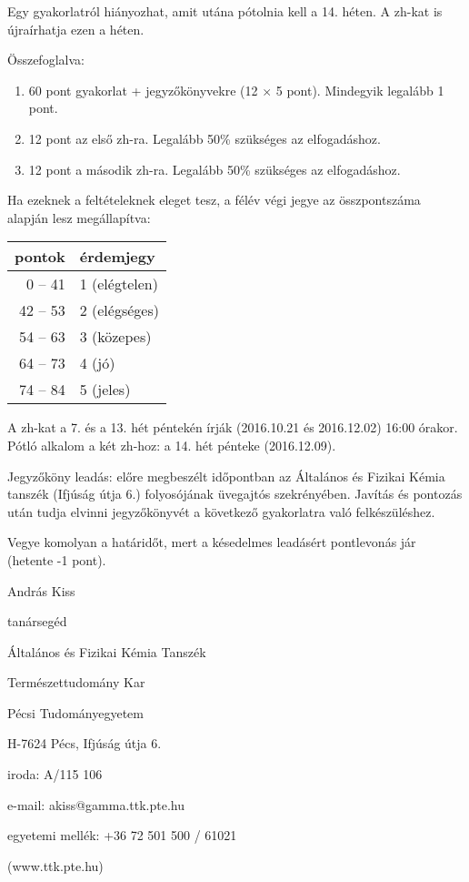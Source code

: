 \documentclass{article}
\begin{document}
Egy gyakorlatról hiányozhat, amit utána pótolnia kell a 14. héten. A zh-kat is újraírhatja ezen a héten.

Összefoglalva:

\begin{enumerate}
\item 60 pont gyakorlat + jegyzőkönyvekre (12 $\times$ 5 pont).  Mindegyik legalább 1 pont.
\item 12 pont az első zh-ra. Legalább 50\% szükséges az elfogadáshoz.
\item 12 pont a második zh-ra. Legalább 50\% szükséges az elfogadáshoz. 
\end{enumerate}

Ha ezeknek a feltételeknek eleget tesz, a félév végi jegye az összpontszáma alapján lesz megállapítva:

\begin{center}
\begin{tabular}{|r|l|}
\hline
pontok & érdemjegy \\
\hline
0 -- 41 & 1 (elégtelen) \\
\hline
42 -- 53 & 2 (elégséges) \\
\hline
54 -- 63 & 3 (közepes) \\
\hline
64 -- 73 & 4 (jó) \\
\hline
74 -- 84 & 5 (jeles) \\
\hline
\end{tabular}
\end{center}

A zh-kat a 7. és a 13. hét péntekén írják (2016.10.21 és 2016.12.02) 16:00 órakor. Pótló alkalom a két zh-hoz: a 14. hét pénteke (2016.12.09).

Jegyzőköny leadás: előre megbeszélt időpontban az Általános és Fizikai Kémia tanszék (Ifjúság útja 6.) folyosójának üvegajtós szekrényében. Javítás és pontozás után tudja elvinni jegyzőkönyvét a következő gyakorlatra való felkészüléshez.

Vegye komolyan a határidőt, mert a késedelmes leadásért pontlevonás jár (hetente -1 pont).

\vspace{10mm}

András Kiss

tanársegéd

Általános és Fizikai Kémia Tanszék

Természettudomány Kar

Pécsi Tudományegyetem

H-7624 Pécs, Ifjúság útja 6.

iroda: A/115 106

e-mail: akiss@gamma.ttk.pte.hu

egyetemi mellék: +36 72 501 500 / 61021

(www.ttk.pte.hu)
\end{document}
